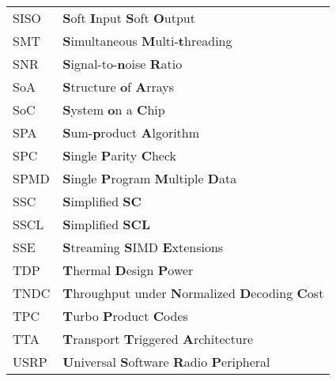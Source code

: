 \begin{center}
\begin{longtable}{ p{}  p{} }
SISO        & \textbf{S}oft \textbf{I}nput \textbf{S}oft \textbf{O}utput                                                      \\
SMT         & \textbf{S}imultaneous \textbf{M}ulti-\textbf{t}hreading                                                         \\
SNR         & \textbf{S}ignal-to-\textbf{n}oise \textbf{R}atio                                                                \\
SoA         & \textbf{S}tructure \textbf{o}f \textbf{A}rrays                                                                  \\
SoC         & \textbf{S}ystem \textbf{o}n a \textbf{C}hip                                                                     \\
SPA         & \textbf{S}um-\textbf{p}roduct \textbf{A}lgorithm                                                                \\
SPC         & \textbf{S}ingle \textbf{P}arity \textbf{C}heck                                                                  \\
SPMD        & \textbf{S}ingle \textbf{P}rogram \textbf{M}ultiple \textbf{D}ata                                                \\
SSC         & \textbf{S}implified \textbf{SC}                                                                                 \\
SSCL        & \textbf{S}implified \textbf{SCL}                                                                                \\
SSE         & \textbf{S}treaming \textbf{S}IMD \textbf{E}xtensions                                                            \\
TDP         & \textbf{T}hermal \textbf{D}esign \textbf{P}ower                                                                 \\
TNDC        & \textbf{T}hroughput under \textbf{N}ormalized \textbf{D}ecoding \textbf{C}ost                                   \\
TPC         & \textbf{T}urbo \textbf{P}roduct \textbf{C}odes                                                                  \\
TTA         & \textbf{T}ransport \textbf{T}riggered \textbf{A}rchitecture                                                     \\
USRP        & \textbf{U}niversal \textbf{S}oftware \textbf{R}adio \textbf{P}eripheral                                         \\

\end{longtable}
\end{center}
